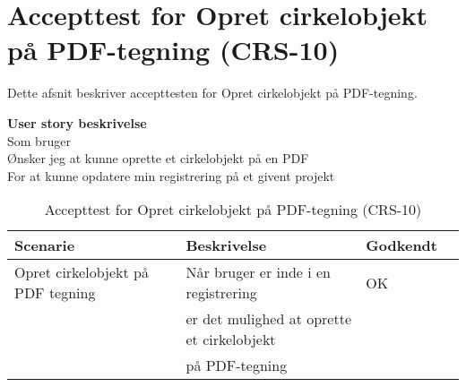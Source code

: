 \section{Accepttest for Opret cirkelobjekt på PDF-tegning (CRS-10)}
Dette afsnit beskriver accepttesten for Opret cirkelobjekt på PDF-tegning.

\textbf{User story beskrivelse} \\
Som bruger \\
Ønsker jeg at kunne oprette et cirkelobjekt på en PDF \\
For at kunne opdatere min registrering på et givent projekt

\begin{table}[H]
	\centering
	\begin{tabular}{|ll|l|ll|} \hline
		\textbf{Scenarie} &  & \textbf{Beskrivelse}&  \textbf{Godkendt}&  \\ \hline
		Opret cirkelobjekt på PDF tegning&  &  Når bruger er inde i en registrering &  OK&  \\
		& & er det mulighed at oprette et cirkelobjekt& & \\ 
		& & på PDF-tegning& & \\ \hline
	\end{tabular}
	\caption{Accepttest for Opret cirkelobjekt på PDF-tegning (CRS-10)}
	\label{AcceptCirkel}
\end{table}